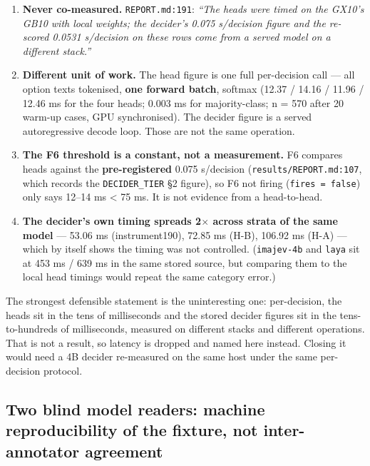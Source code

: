 \documentclass[11pt,a4paper]{article}
\begin{document}
\begin{enumerate}
\item \textbf{Never co-measured.} \texttt{REPORT.md:191}: \emph{``The heads were timed on the GX10's GB10 with local weights; the decider's 0.075 s/decision figure and the re-scored 0.0531 s/decision on these rows come from a served model on a different stack.''}
\item \textbf{Different unit of work.} The head figure is one full per-decision call --- all option texts tokenised, \textbf{one forward batch}, softmax (12.37 / 14.16 / 11.96 / 12.46 ms for the four heads; 0.003 ms for majority-class; n = 570 after 20 warm-up cases, GPU synchronised). The decider figure is a served autoregressive decode loop. Those are not the same operation.
\item \textbf{The F6 threshold is a constant, not a measurement.} F6 compares heads against the \textbf{pre-registered} 0.075 s/decision (\texttt{results/REPORT.md:107}, which records the \texttt{DECIDER\_TIER} \S2 figure), so F6 not firing (\texttt{fires = false}) only says 12--14 ms < 75 ms. It is not evidence from a head-to-head.
\item \textbf{The decider's own timing spreads 2$\times$ across strata of the same model} --- 53.06 ms (instrument190), 72.85 ms (H-B), 106.92 ms (H-A) --- which by itself shows the timing was not controlled. (\texttt{imajev-4b} and \texttt{laya} sit at 453 ms / 639 ms in the same stored source, but comparing them to the local head timings would repeat the same category error.)
\end{enumerate}

The strongest defensible statement is the uninteresting one: per-decision, the heads sit in the tens of milliseconds and the stored decider figures sit in the tens-to-hundreds of milliseconds, measured on different stacks and different operations. That is not a result, so latency is dropped and named here instead. Closing it would need a 4B decider re-measured on the same host under the same per-decision protocol.

\subsection{Two blind model readers: machine reproducibility of the fixture, \textbf{not} inter-annotator agreement}
\end{document}
